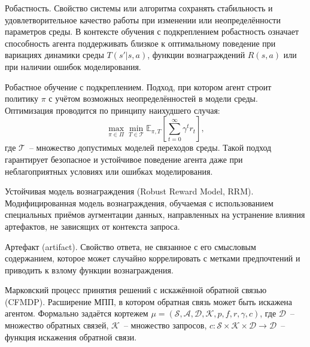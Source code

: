 \begin{definition}
\begin{definition}
    \label{def:robustness}
    Робастность. Свойство системы или алгоритма сохранять стабильность и удовлетворительное качество работы при изменении или неопределённости параметров среды.  
    В контексте обучения с подкреплением робастность означает способность агента поддерживать близкое к оптимальному поведение при вариациях динамики среды $T(s'|s,a)$, функции вознаграждений $R(s,a)$ или при наличии ошибок моделирования.
\end{definition}

\begin{definition}
    \label{def:robust_rl}
    Робастное обучение с подкреплением. Подход, при котором агент строит политику $\pi$ с учётом возможных неопределённостей в модели среды.  
    Оптимизация проводится по принципу наихудшего случая:
    \begin{equation}
    \max_{\pi \in \Pi} \min_{T \in \mathcal{T}} \mathbb{E}_{\pi, T}\left[\sum_{t=0}^{\infty} \gamma^t r_t\right],
    \end{equation}
    где $\mathcal{T}$~-- множество допустимых моделей переходов среды.  
    Такой подход гарантирует безопасное и устойчивое поведение агента даже при неблагоприятных условиях или ошибках моделирования.
\end{definition}


\begin{definition}
    \label{def:rrm}
    Устойчивая модель вознаграждения (Robust Reward Model, RRM). Модифицированная модель вознаграждения, обучаемая с использованием специальных приёмов аугментации данных, направленных на устранение влияния артефактов, не зависящих от контекста запроса.
\end{definition}

\begin{definition}
    \label{def:artifact}
    Артефакт (artifact). Свойство ответа, не связанное с его смысловым содержанием, которое может случайно коррелировать с метками предпочтений и приводить к взлому функции вознаграждения.
\end{definition}


\begin{definition}
    \label{def:cfmdp}
    Марковский процесс принятия решений с искажённой обратной связью (CFMDP). Расширение МПП, в котором обратная связь может быть искажена агентом. Формально задаётся кортежем $\mu = (\mathcal{S}, \mathcal{A}, \mathcal{D}, \mathcal{K}, p, f, r, \gamma, c)$, где $\mathcal{D}$~-- множество обратных связей, $\mathcal{K}$~-- множество запросов, $c:\mathcal{S}\times\mathcal{K}\times\mathcal{D}\rightarrow\mathcal{D}$~-- функция искажения обратной связи.
\end{definition}


\end{definition}
